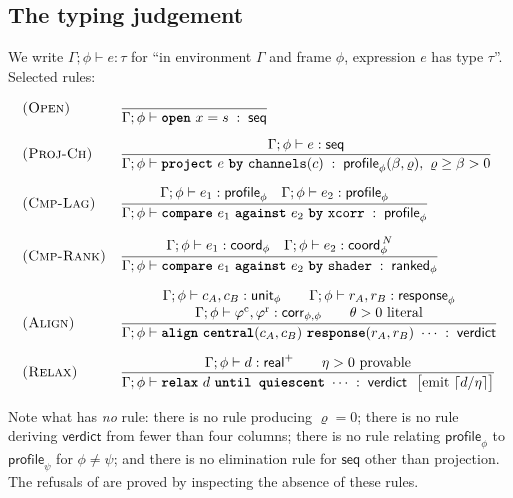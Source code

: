 \documentclass[11pt,twocolumn,a4paper]{article}
\theoremstyle{plain}
\theoremstyle{definition}
\theoremstyle{remark}
\newcommand{\flo}{\beta}                       %
\newcommand{\Res}{\varrho}                     %
\newcommand{\typ}[1]{\ensuremath{\mathsf{#1}}}
\newcommand{\kw}[1]{\texttt{\textbf{#1}}}
\begin{document}
\subsection{The typing judgement}

We write $\Gamma;\phi \vdash e : \tau$ for ``in environment $\Gamma$ and
frame $\phi$, expression $e$ has type $\tau$''. Selected rules:

\begin{align*}
&\textsc{(Open)} &&
\frac{}{\Gamma;\phi \vdash \kw{open}\ x = s \;:\; \typ{seq}}
\\[6pt]
&\textsc{(Proj-Ch)} &&
\frac{\Gamma;\phi\vdash e:\typ{seq}}
     {\Gamma;\phi\vdash \kw{project}\ e\ \kw{by}\ \texttt{channels}(c)
       \;:\; \typ{profile}_\phi(\flo,\Res),\ \Res\ge\flo>0}
\\[6pt]
&\textsc{(Cmp-Lag)} &&
\frac{\Gamma;\phi\vdash e_1:\typ{profile}_\phi \quad
      \Gamma;\phi\vdash e_2:\typ{profile}_\phi}
     {\Gamma;\phi\vdash \kw{compare}\ e_1\ \kw{against}\ e_2\ \kw{by}\ \texttt{xcorr}
       \;:\;\typ{profile}_\phi}
\\[6pt]
&\textsc{(Cmp-Rank)} &&
\frac{\Gamma;\phi\vdash e_1:\typ{coord}_\phi \quad
      \Gamma;\phi\vdash e_2:\typ{coord}_\phi^{\,N}}
     {\Gamma;\phi\vdash \kw{compare}\ e_1\ \kw{against}\ e_2\ \kw{by}\ \texttt{shader}
       \;:\;\typ{ranked}_\phi}
\\[6pt]
&\textsc{(Align)} &&
\frac{\begin{array}{c}
       \Gamma;\phi\vdash c_A,c_B : \typ{unit}_\phi \qquad
       \Gamma;\phi\vdash r_A,r_B : \typ{response}_\phi \\
       \Gamma;\phi\vdash \varphi^{\mathrm{c}},\varphi^{\mathrm{r}} : \typ{corr}_{\phi,\phi}
       \qquad \theta>0 \text{ literal}
      \end{array}}
     {\Gamma;\phi\vdash \kw{align}\ \kw{central}(c_A,c_B)\ \kw{response}(r_A,r_B)\ \cdots
       \;:\;\typ{verdict}}
\\[6pt]
&\textsc{(Relax)} &&
\frac{\Gamma;\phi\vdash d:\typ{real}^{+} \qquad \eta>0 \text{ provable}}
     {\Gamma;\phi\vdash \kw{relax}\ d\ \kw{until\ quiescent}\ \cdots
       \;:\;\typ{verdict}
       \ \ \big[\text{emit } \lceil d/\eta\rceil\big]}
\end{align*}

Note what has \emph{no} rule: there is no rule producing $\Res=0$; there
is no rule deriving \typ{verdict} from fewer than four columns; there is
no rule relating $\typ{profile}_\phi$ to $\typ{profile}_\psi$ for
$\phi\ne\psi$; and there is no elimination rule for \typ{seq} other than
projection. The refusals of  are proved by inspecting the
absence of these rules.
\end{document}

